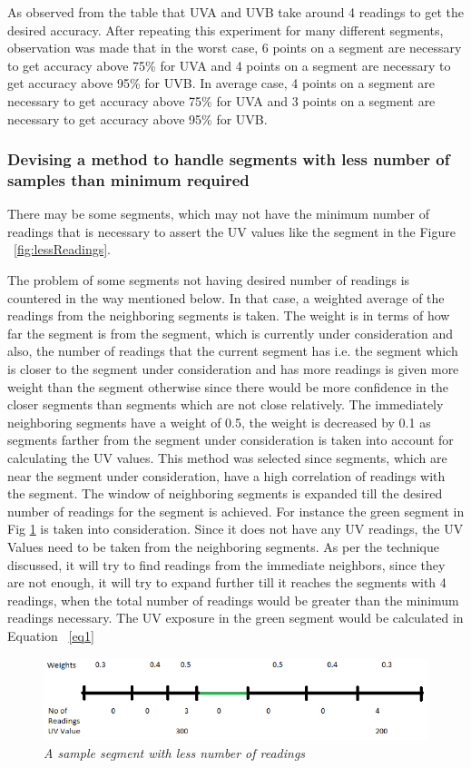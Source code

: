 \documentclass[10pt]{sigplan-proc-varsize}
\begin{document}
As observed from the table that UVA and UVB take around 4 readings to get the desired accuracy. After repeating this experiment for many different segments, observation was made that in the worst case, 6 points on a segment are necessary to get accuracy above 75\% for UVA and 4 points on a segment are necessary to get accuracy above 95\% for UVB.
In average case, 4 points on a segment are necessary to get accuracy above 75\% for UVA and  3 points on a segment are necessary to get accuracy above 95\% for UVB.


\subsubsection{Devising a method to handle segments with less number of samples than minimum required}
There may be some segments, which may not have the minimum number of readings that is necessary to assert the UV values like the segment in the Figure ~\ref{fig:lessReadings}. 

The problem of some segments not having desired number of readings is countered in the way mentioned below. In that case, a weighted average of the readings from the neighboring segments is taken. The weight is in terms of how far the segment is from the segment, which is currently under consideration and also, the number of readings that the current segment has i.e. the segment which is closer to the segment under consideration and has more readings is given more weight than the segment otherwise since there would be more confidence in the closer segments than segments which are not close relatively. The immediately neighboring segments have a weight of 0.5, the weight is decreased by 0.1 as segments farther from the segment under consideration is taken into account for calculating the UV values. This method was selected since segments, which are near the segment under consideration, have a high correlation of readings with the segment. The window of neighboring segments is expanded till the desired number of readings for the segment is achieved. For instance the green segment in Fig \ref{fig:segmentLessReadings} is taken into consideration. Since it does not have any UV readings, the UV Values need to be taken from the neighboring segments. As per the technique discussed, it will try to find readings from the immediate neighbors, since they are not enough, it will try to expand further till it reaches the segments with 4 readings, when the total number of readings would be greater than the minimum readings necessary. The UV exposure in the green segment would be calculated in Equation ~\ref{eq1}
\begin{figure}[h]
\begin{center}
\includegraphics[scale=0.4]{segmentLessReadings.png}
\caption{\small \sl A sample segment with less number of readings}
\label{fig:segmentLessReadings}
\end{center}
\end{figure}
\end{document}
